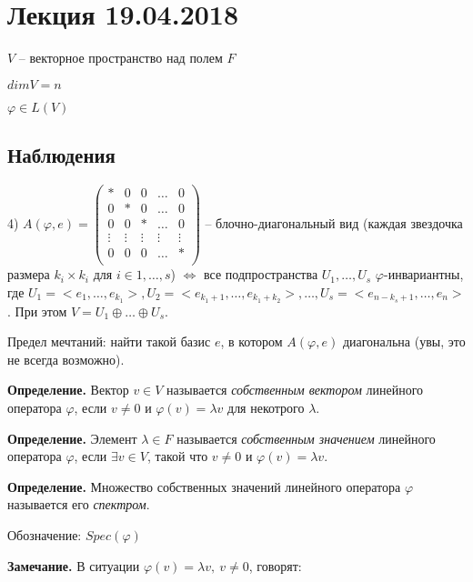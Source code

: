 \section{Лекция 19.04.2018}

$V$ --  векторное пространство над полем $F$

$dim V = n$

$\varphi \in L(V)$

\subsection{Наблюдения}

4) $A(\varphi, e) = \left(
\begin{array}{c|c|c|c|c}
  * & 0 & 0 & \dots & 0  \\
  \hline
  0 & * & 0 & \dots & 0  \\
  \hline
  0 & 0 & * & \dots & 0 \\
  \hline
  \vdots & \vdots & \vdots & \vdots & \vdots \\
  \hline
  0 & 0 & 0 & \dots & * \\
\end{array}
\right)$ -- блочно-диагональный вид (каждая звездочка размера $k_i \times k_i$ для $i \in 1, \dots, s$) $\Leftrightarrow$ все подпространства $U_1, \dots, U_s$ $\varphi$-инвариантны, где $U_1 = <e_1, \dots, e_{k_1}>, U_2 = <e_{k_1 + 1}, \dots, e_{k_1 + k_2}>, \dots, U_s = <e_{n-k_s+1}, \dots, e_n>$. При этом $V = U_1 \oplus \dots \oplus U_s$.

Предел мечтаний: найти такой базис $e$, в котором $A(\varphi, e)$ диагональна (увы, это не всегда возможно).

\vspace{\baselineskip}
\textbf{Определение.} Вектор $v \in V$ называется \textit{собственным вектором} линейного оператора $\varphi$, если $v \neq 0$ и $\varphi(v) = \lambda v$ для некотрого $\lambda$. 

\vspace{\baselineskip}
\textbf{Определение.} Элемент $\lambda \in F$ называется \textit{собственным значением} линейного оператора $\varphi$, если $\exists v \in V$, такой что $v \neq 0$ и $\varphi(v) = \lambda v$.

\vspace{\baselineskip}
\textbf{Определение.} Множество собственных значений линейного оператора $\varphi$ называется его \textit{спектром}.

Обозначение: $Spec(\varphi)$

\vspace{\baselineskip}
\textbf{Замечание.} В ситуации $\varphi(v) = \lambda v, \ v \neq 0$, говорят:

